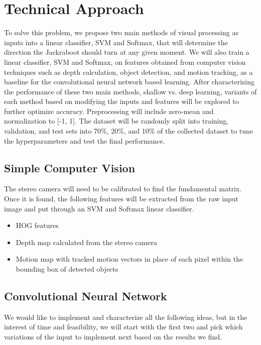 \documentclass[10pt,twocolumn,letterpaper]{article}
\begin{document}
\section{Technical Approach}
To solve this problem, we propose two main methods of visual processing as inputs into a linear classifier, SVM and Softmax, that will determine the direction the Jackraboot should turn at any given moment. We will also train a linear classifier, SVM and Softmax, on features obtained from computer vision techniques such as depth calculation, object detection, and motion tracking, as a baseline for the convolutional neural network based learning. After characterizing the performance of these two main methods, shallow vs. deep learning, variants of each method based on modifying the inputs and features will be explored to further optimize accuracy. Preprocessing will include zero-mean and normalization to [-1, 1]. The dataset will be randomly split into training, validation, and test sets into 70\%, 20\%, and 10\% of the collected dataset to tune the hyperparameters and test the final performance.

\subsection{Simple Computer Vision}

The stereo camera will need to be calibrated to find the fundamental matrix. Once it is found,  the following features will be extracted from the raw input image and put through an SVM and Softmax linear classifier. 

\begin{itemize}
\item HOG features
\item Depth map calculated from the stereo camera
\item Motion map with tracked motion vectors in place of each pixel within the bounding box of detected objects
\end{itemize}


\subsection{Convolutional Neural Network}

We would like to implement and characterize all the following ideas, but in the interest of time and feasibility, we will start with the first two and pick which variations of the input to implement next based on the results we find. 
\end{document}

